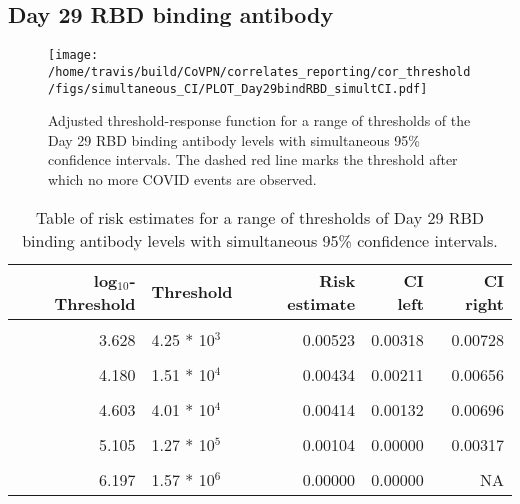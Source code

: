 \documentclass[]{book}
\theoremstyle{definition}
\theoremstyle{definition}
\theoremstyle{definition}
\newcommand{\1}{\mathbbm{1}}
\begin{document}
\clearpage

\clearpage

\clearpage

\hypertarget{day-29-rbd-binding-antibody-2}{%
\subsection{Day 29 RBD binding antibody}\label{day-29-rbd-binding-antibody-2}}

\begin{figure}[H]
\centering
\texttt{[image: /home/travis/build/CoVPN/correlates\_reporting/cor\_threshold/figs/simultaneous\_CI/PLOT\_Day29bindRBD\_simultCI.pdf]}
\caption{Adjusted threshold-response function for a range of thresholds of the
  Day 29 RBD binding antibody levels with simultaneous 95\% confidence intervals. The dashed red line marks the threshold after which no more COVID events are observed. }
\end{figure}
\begin{table}[!h]

\caption{\label{tab:unnamed-chunk-389}Table of risk estimates for a range of thresholds of Day 29 RBD binding antibody levels with simultaneous 95\% confidence intervals.}
\centering
\begin{tabular}[t]{rlrrr}
\toprule
log$_{10}$-Threshold & Threshold & Risk estimate & CI left & CI right\\
\midrule
\cellcolor{gray!6}{2.882} & \cellcolor{gray!6}{7.62 * 10$^2$} & \cellcolor{gray!6}{0.00576} & \cellcolor{gray!6}{0.00374} & \cellcolor{gray!6}{0.00779}\\
3.628 & 4.25 * 10$^3$ & 0.00523 & 0.00318 & 0.00728\\
\cellcolor{gray!6}{3.889} & \cellcolor{gray!6}{7.74 * 10$^3$} & \cellcolor{gray!6}{0.00459} & \cellcolor{gray!6}{0.00255} & \cellcolor{gray!6}{0.00663}\\
4.180 & 1.51 * 10$^4$ & 0.00434 & 0.00211 & 0.00656\\
\cellcolor{gray!6}{4.395} & \cellcolor{gray!6}{2.48 * 10$^4$} & \cellcolor{gray!6}{0.00486} & \cellcolor{gray!6}{0.00217} & \cellcolor{gray!6}{0.00755}\\
4.603 & 4.01 * 10$^4$ & 0.00414 & 0.00132 & 0.00696\\
\cellcolor{gray!6}{4.826} & \cellcolor{gray!6}{6.70 * 10$^4$} & \cellcolor{gray!6}{0.00365} & \cellcolor{gray!6}{0.00054} & \cellcolor{gray!6}{0.00676}\\
5.105 & 1.27 * 10$^5$ & 0.00104 & 0.00000 & 0.00317\\
\cellcolor{gray!6}{5.422} & \cellcolor{gray!6}{2.64 * 10$^5$} & \cellcolor{gray!6}{0.00097} & \cellcolor{gray!6}{0.00000} & \cellcolor{gray!6}{0.00385}\\
6.197 & 1.57 * 10$^6$ & 0.00000 & 0.00000 & NA\\
\bottomrule
\end{tabular}
\end{table}
\end{document}
